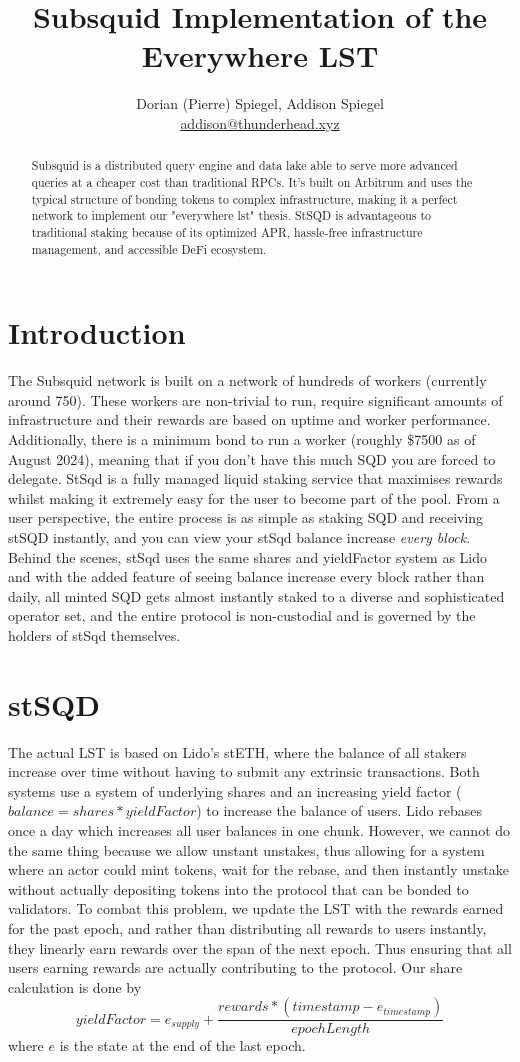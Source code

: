 \documentclass{article}
\title{Subsquid Implementation of the Everywhere LST}
\author{Dorian (Pierre) Spiegel, Addison Spiegel \\ \href{mailto:addison@thunderhead.xyz}{addison@thunderhead.xyz}}
\begin{document}
\date{}
\maketitle
\begin{abstract}
    Subsquid is a distributed query engine and data lake able to serve more advanced queries at a cheaper cost than traditional RPCs. It's built on Arbitrum and uses the typical structure of bonding tokens to complex infrastructure, making it a perfect network to implement our "everywhere lst" thesis. StSQD is advantageous to traditional staking because of its optimized APR, hassle-free infrastructure management, and accessible DeFi ecosystem.
\end{abstract}
\section{Introduction}
The Subsquid network is built on a network of hundreds of workers (currently around 750). These workers are non-trivial to run, require significant amounts of infrastructure and their rewards are based on uptime and worker performance. Additionally, there is a minimum bond to run a worker (roughly \$7500 as of August 2024), meaning that if you don't have this much SQD you are forced to delegate. StSqd is a fully managed liquid staking service that maximises rewards whilst making it extremely easy for the user to become part of the pool. From a user perspective, the entire process is as simple as staking SQD and receiving stSQD instantly, and you can view your stSqd balance increase \textit{every block}. Behind the scenes, stSqd uses the same shares and yieldFactor system as Lido and with the added feature of seeing balance increase every block rather than daily, all minted SQD gets almost instantly staked to a diverse and sophisticated operator set, and the entire protocol is non-custodial and is governed by the holders of stSqd themselves.
\section{stSQD}
The actual LST is based on Lido's stETH, where the balance of all stakers increase over time without having to submit any extrinsic transactions. Both systems use a system of underlying shares and an increasing yield factor ($balance = shares * yieldFactor$) to increase the balance of users. Lido rebases once a day which increases all user balances in one chunk. However, we cannot do the same thing because we allow unstant unstakes, thus allowing for a system where an actor could mint tokens, wait for the rebase, and then instantly unstake without actually depositing tokens into the protocol that can be bonded to validators. To combat this problem, we update the LST with the rewards earned for the past epoch, and rather than distributing all rewards to users instantly, they linearly earn rewards over the span of the next epoch. Thus ensuring that all users earning rewards are actually contributing to the protocol. Our share calculation is done by
\[yieldFactor=e_{supply}+\frac{rewards*(timestamp-e_{timestamp})}{epochLength}\]
where $e$ is the state at the end of the last epoch.
\end{document}
